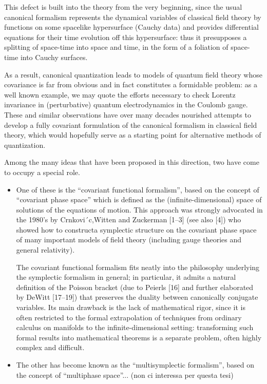\documentclass[Main]{subfiles}
\begin{document}
			This defect is built into the theory from the very beginning, since the usual canonical formalism represents the dynamical variables of classical field theory by functions on some spacelike hypersurface (Cauchy data) and provides differential equations for their time evolution off this hypersurface: thus it presupposes a splitting of space-time into space and time, in the form of a foliation of space-time into Cauchy surfaces.
			
			As a result, canonical quantization leads to models of quantum field theory whose covariance is far from obvious and in fact constitutes a formidable problem: as a well known example, we may quote the efforts necessary to check Lorentz invariance in (perturbative) quantum electrodynamics in the Coulomb gauge. \\
			These and similar observations have over many decades nourished attempts to develop a fully covariant formulation of the canonical formalism in classical field theory, which would hopefully serve as a starting point for alternative methods of quantization.
			
			Among the many ideas that have been proposed in this direction, two have come to occupy a special role. 
			\begin{itemize}
				\item  One of these is the “covariant functional formalism”, based on the concept 	of “covariant phase space” which is defined as the (infinite-dimensional) space of solutions of the equations of motion.
					This approach was strongly advocated in the 1980’s by Crnkovi´c,Witten and Zuckerman [1–3] (see also [4]) who showed how to constructa symplectic structure on the covariant phase space of many important models of field theory (including gauge theories and general relativity).
				
					The covariant functional formalism fits neatly into the philosophy underlying the symplectic formalism in general; in particular, it admits a natural definition of the Poisson bracket (due to Peierls [16] and further elaborated by DeWitt [17–19]) that preserves the duality between canonically conjugate variables. 
					Its main drawback is the lack of mathematical rigor, since it is often restricted to the formal extrapolation of techniques from ordinary calculus on manifolds to the infinite-dimensional setting: transforming such formal results into mathematical theorems is a separate problem, often highly complex and difficult.
					
				\item The other has become known as the “multisymplectic formalism”, based on the concept of “multiphase space”... (non ci interessa per questa tesi)
			\end{itemize}			
\end{document}
